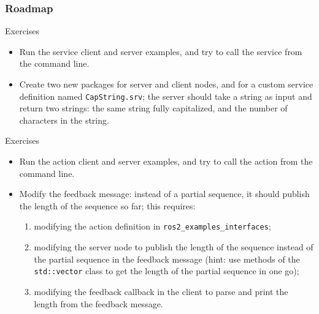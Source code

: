 \documentclass[aspectratio=169]{beamer}
\begin{document}
\frame{\titlepage}



\begin{frame}
	\frametitle{Roadmap}
	\tableofcontents
\end{frame}







\begin{frame}{Exercises}
	\begin{itemize}
		\item Run the service client and server examples, and try to call the service from the command line.
		\item Create two new packages for server and client nodes, and for a custom service definition named \texttt{CapString.srv}; the server should take a string as input and return two strings: the same string fully capitalized, and the number of characters in the string.
	\end{itemize}
\end{frame}
\begin{frame}{Exercises}
	\begin{itemize}
		\item Run the action client and server examples, and try to call the action from the command line.
		\item Modify the feedback message: instead of a partial sequence, it should publish the length of the sequence so far; this requires:
		      \begin{enumerate}
			      \item modifying the action definition in \texttt{ros2\_examples\_interfaces};
			      \item modifying the server node to publish the length of the sequence instead of the partial sequence in the feedback message (hint: use methods of the \texttt{std::vector} class to get the length of the partial sequence in one go);
			      \item modifying the feedback callback in the client to parse and print the length from the feedback message.
		      \end{enumerate}
	\end{itemize}
\end{frame}
\end{document}
